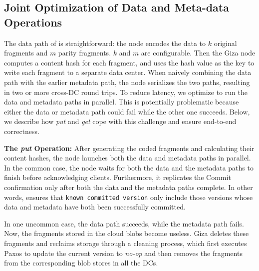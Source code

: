 \subsection{Joint Optimization of Data and Meta-data Operations}

The data path of \name is straightforward: the \name node encodes the data to
$k$ original fragments and $m$ parity fragments. $k$ and $m$ are configurable.
Then the Giza node computes a content hash for each fragment, and uses the hash
value as the key to write each fragment to a separate data center. When naively
combining the data path with the earlier metadata path, the \name node
serializes the two paths, resulting in two or more cross-DC round trips. To
reduce latency, we optimize \name to run the data and metadata paths in
parallel. This is potentially problematic because either the data or metadata
path could fail while the other one succeeds. Below, we describe how {\em put}
and {\em get} cope with this challenge and ensure end-to-end correctness.


{\bf The \emph{put} Operation:} After generating the coded fragments and calculating
their content hashes, the \name node launches both the data and metadata paths
in parallel. In the common case, the \name node waits for both the data and the
metadata paths to finish before acknowledging clients. Furthermore, it
replicates the Commit confirmation only after both the data and the metadata
paths complete. In other words, \name ensures that {\tt known committed version}
only include those versions whose data and metadata have both been successfully
committed.

In one uncommon case, the data path succeeds, while the metadata path fails.
Now, the fragments stored in the cloud blobs become useless.
Giza deletes these fragments and reclaims storage through a cleaning process,
which first executes Paxos to update the current version to {\em no-op}
and then removes the fragments from the corresponding blob stores in all the DCs.

